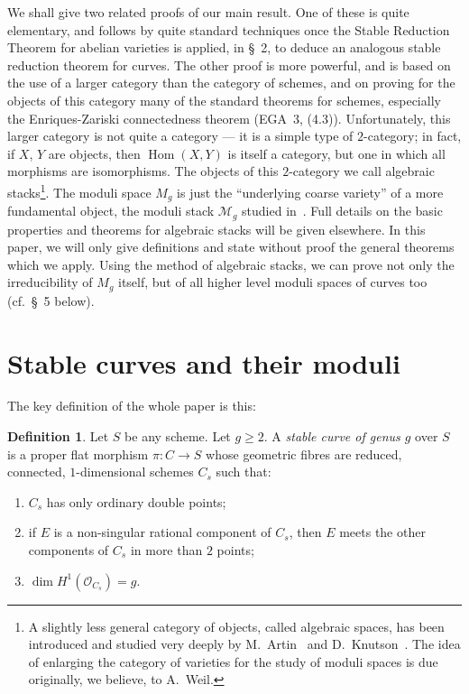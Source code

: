 \documentclass[10pt]{amsart}
\theoremstyle{plain}
\theoremstyle{definition}
\newtheorem{definition}[theorem]{Definition}
\DeclareMathOperator{\Hom}{Hom}
\newcommand{\cO}{\mathcal{O}}
\begin{document}
We shall give two related proofs of our main result. One of these is quite elementary, and follows by quite standard techniques once the Stable Reduction Theorem for abelian varieties is applied, in \S~2, to deduce an analogous stable reduction theorem for curves. The other proof is more powerful, and is based on the use of a larger category than the category of schemes, and on proving for the objects of this category many of the standard theorems for schemes, especially the Enriques-Zariski connectedness theorem (EGA~3, (4.3)). Unfortunately, this larger category is not quite a category --- it is a simple type of $2$-category; in fact, if $X$, $Y$ are objects, then $\Hom(X,Y)$ is itself a category, but one in which all morphisms are isomorphisms. The objects of this $2$-category we call algebraic stacks\footnote{A slightly less general category of objects, called algebraic spaces, has been introduced and studied very deeply by M.~Artin~\cite{A1} and D.~Knutson~\cite{K}. The idea of enlarging the category of varieties for the study of moduli spaces is due originally, we believe, to A.~Weil.}. The moduli space $M_g$ is just the ``underlying coarse variety'' of a more fundamental object, the moduli stack $\mathscr{M}_g$ studied in~\cite{Ma}. Full details on the basic properties and theorems for algebraic stacks will be given elsewhere. In this paper, we will only give definitions and state without proof the general theorems which we apply. Using the method of algebraic stacks, we can prove not only the irreducibility of $M_g$ itself, but of all higher level moduli spaces of curves too (cf.~\S~5 below).

\section{Stable curves and their moduli}\label{sec:1}

The key definition of the whole paper is this:

\begin{definition}\label{def:1.1}
Let $S$ be any scheme. Let $g \geq 2$. A \emph{stable curve of genus $g$} over $S$ is a proper flat morphism $\pi: C \to S$ whose geometric fibres are reduced, connected, $1$-dimensional schemes $C_s$ such that:
\begin{enumerate}
\item[(i)] $C_s$ has only ordinary double points;
\item[(ii)] if $E$ is a non-singular rational component of $C_s$, then $E$ meets the other components of $C_s$ in more than $2$ points;
\item[(iii)] $\dim H^1(\cO_{C_s}) = g$.
\end{enumerate}
\end{definition}
\end{document}
